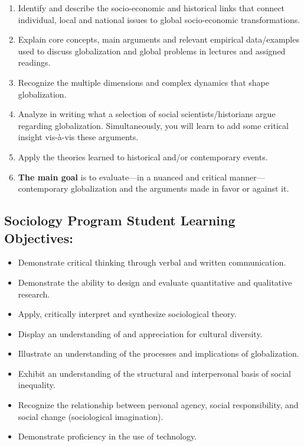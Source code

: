 \documentclass[11pt,]{article}
\providecommand{\tightlist}{%
  \setlength{\itemsep}{0pt}\setlength{\parskip}{0pt}}
\begin{document}
\begin{enumerate}
\def\labelenumi{\arabic{enumi}.}
\tightlist
\item
  Identify and describe the socio-economic and historical links that
  connect individual, local and national issues to global socio-economic
  transformations.
\item
  Explain core concepts, main arguments and relevant empirical
  data/examples used to discuss globalization and global problems in
  lectures and assigned readings.
\item
  Recognize the multiple dimensions and complex dynamics that shape
  globalization.
\item
  Analyze in writing what a selection of social scientists/historians
  argue regarding globalization. Simultaneously, you will learn to add
  some critical insight vis-à-vis these arguments.
\item
  Apply the theories learned to historical and/or contemporary events.
\item
  \textbf{The main goal} is to evaluate---in a nuanced and critical
  manner---contemporary globalization and the arguments made in favor or
  against it.
\end{enumerate}

\hypertarget{sociology-program-student-learning-objectives}{%
\subsection{Sociology Program Student Learning
Objectives:}\label{sociology-program-student-learning-objectives}}

\begin{itemize}
\tightlist
\item
  Demonstrate critical thinking through verbal and written
  communication.
\item
  Demonstrate the ability to design and evaluate quantitative and
  qualitative research.
\item
  Apply, critically interpret and synthesize sociological theory.
\item
  Display an understanding of and appreciation for cultural diversity.
\item
  Illustrate an understanding of the processes and implications of
  globalization.
\item
  Exhibit an understanding of the structural and interpersonal basis of
  social inequality.
\item
  Recognize the relationship between personal agency, social
  responsibility, and social change (sociological imagination).
\item
  Demonstrate proficiency in the use of technology.
\end{itemize}
\end{document}
